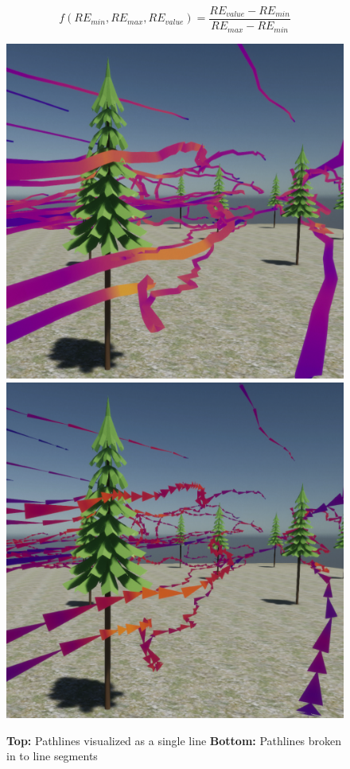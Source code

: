 \begin{equation} \label{eq:3}
f(RE_{min},RE_{max},RE_{value}) = \frac{RE_{value}-RE_{min}}{RE_{max}-RE_{min}}
\end{equation} 

\begin{figure}
\centering
\includegraphics[scale=.3]{Figures/TreePathline1.png}
\includegraphics[scale=.3]{Figures/TreePathline2.png}
\decoRule
\caption[Pathlines comparisons in Unity]{\textbf{Top:} Pathlines visualized as a single line  \textbf{Bottom:} Pathlines broken in to line segments }
\label{fig:UnityPathline}
\end{figure}
